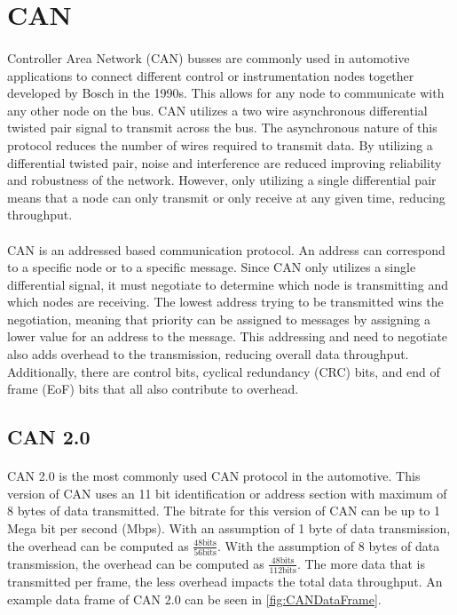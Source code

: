 \section{CAN}

\paragraph{}
Controller Area Network (CAN)\cite{wikipediaCAN} busses are commonly used in automotive applications to connect different control or instrumentation nodes together developed by Bosch in the 1990s.
This allows for any node to communicate with any other node on the bus.
CAN utilizes a two wire asynchronous differential twisted pair signal to transmit across the bus.
The asynchronous nature of this protocol reduces the number of wires required to transmit data.
By utilizing a differential twisted pair, noise and interference are reduced improving reliability and robustness of the network.
However, only utilizing a single differential pair means that a node can only transmit or only receive at any given time, reducing throughput.

\paragraph{}
CAN is an addressed based communication protocol.
An address can correspond to a specific node or to a specific message.
Since CAN only utilizes a single differential signal, it must negotiate to determine which node is transmitting and which nodes are receiving.
The lowest address trying to be transmitted wins the negotiation, meaning that priority can be assigned to messages by assigning a lower value for an address to the message.
This addressing and need to negotiate also adds overhead to the transmission, reducing overall data throughput.
Additionally, there are control bits, cyclical redundancy (CRC) bits, and end of frame (EoF) bits that all also contribute to overhead.

\subsection{CAN 2.0}

\paragraph{}
CAN 2.0\cite{BOSCH_CAN20} is the most commonly used CAN protocol in the automotive.
This version of CAN uses an 11 bit identification or address section with maximum of 8 bytes of data transmitted.
The bitrate for this version of CAN can be up to 1 Mega bit per second (Mbps).
With an assumption of 1 byte of data transmission, the overhead can be computed as $\frac{48 \text{bits}}{56 \text{bits}}$.  With the assumption of 8 bytes of data transmission, the overhead can be computed as $\frac{48 \text{bits}}{112 \text{bits}}$.
The more data that is transmitted per frame, the less overhead impacts the total data throughput.
An example data frame of CAN 2.0 can be seen in \cref{fig:CANDataFrame}.


